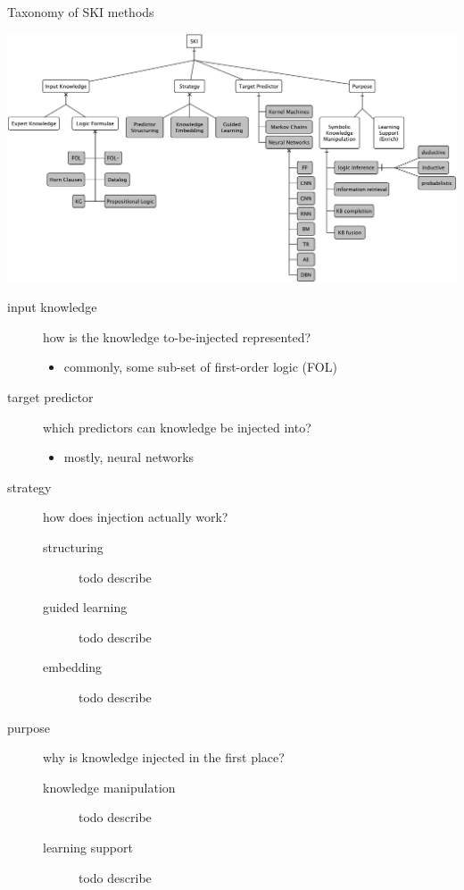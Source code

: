 \documentclass[presentation]{beamer}\mode<presentation>{\usetheme{AMSBolognaFC}}
\begin{document}
\begin{frame}[allowframebreaks]{Taxonomy of SKI methods}
    \begin{center}
        \includegraphics[width=\linewidth]{figures/ski-taxonomy.pdf}
    \end{center}
    
    \framebreak

    \begin{description}
        \item[input knowledge] how is the knowledge to-be-injected represented?
        \begin{itemize}
            \item commonly, some sub-set of first-order logic (FOL)
        \end{itemize} 

        \item[target predictor] which predictors can knowledge be injected into?
        \begin{itemize}
            \item mostly, neural networks
        \end{itemize} 

        \item[strategy] how does injection actually work?
        \begin{description}
            \item[structuring] todo describe
            \item[guided learning] todo describe
            \item[embedding] todo describe
        \end{description} 

        \item[purpose] why is knowledge injected in the first place?
        \begin{description}
            \item[knowledge manipulation] todo describe
            \item[learning support] todo describe
        \end{description} 

    \end{description}
\end{frame}
\end{document}

